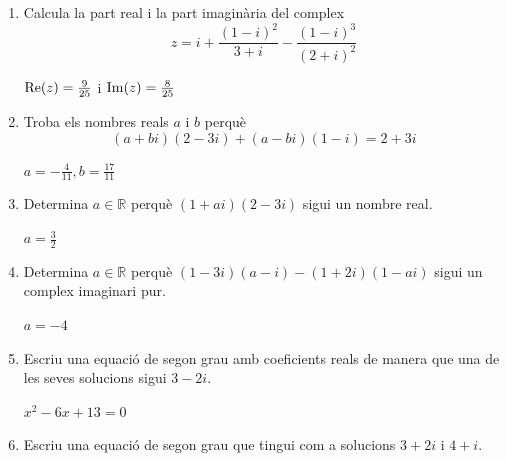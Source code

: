 \begin{enumerate}
\begin{indicacio}
(a)
\[
\left\{
\begin{array}{l}
u=-\frac{21}{13}-\frac{1}{13}i \\
v=\frac{19}{13}-\frac{35}{13}i
\end{array}
\right.
\]
(b)
\[
\left\{
\begin{array}{l}
u=\frac{2}{9}+\frac{4}{9}i \\
v=-\frac{10}{9}-\frac{8}{9}i
\end{array}
\right.
\]
\end{indicacio}

\item Calcula la part real i la part imaginària del complex
\[
z=i+\frac{(1-i)^{2}}{3+i}-\frac{(1-i)^{3}}{(2+i)^{2}}
\]

\begin{indicacio}
$\operatorname{Re}(z)=\frac{9}{25}$ i $\operatorname{Im}(z)=\frac{8}{25}$
\end{indicacio}

\item Troba els nombres reals $a$ i $b$ perquè
\[
(a+bi)(2-3i)+(a-bi)(1-i)=2+3i
\]

\begin{indicacio}
$a=-\frac{4}{11},b=\frac{17}{11}$
\end{indicacio}

\item Determina $a\in \mathbb{R}$ perquè $(1+ai)(2-3i)$ sigui un nombre
real.

\begin{indicacio}
$a=\frac{3}{2}$
\end{indicacio}

\item Determina $a\in \mathbb{R}$ perquè $(1-3i)(a-i)-(1+2i)(1-ai)$ sigui un
complex imaginari pur.

\begin{indicacio}
$a=-4$
\end{indicacio}

\item Escriu una equació de segon grau amb coeficients reals de
manera que una de les seves solucions sigui $3-2i$.

\begin{indicacio}
$x^{2}-6x+13=0$
\end{indicacio}

\item Escriu una equació de segon grau que tingui com a solucions $
3+2i$ i $4+i$.


\end{enumerate}
